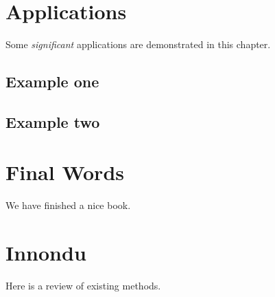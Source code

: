 \documentclass[
]{book}
\begin{document}
\hypertarget{applications}{%
\chapter{Applications}\label{applications}}

Some \emph{significant} applications are demonstrated in this chapter.

\hypertarget{example-one}{%
\section{Example one}\label{example-one}}

\hypertarget{example-two}{%
\section{Example two}\label{example-two}}

\hypertarget{final-words}{%
\chapter{Final Words}\label{final-words}}

We have finished a nice book.

\hypertarget{innondu}{%
\chapter{Innondu}\label{innondu}}

Here is a review of existing methods.

  
\end{document}
